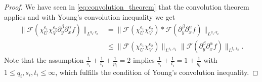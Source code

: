 \documentclass[a4paper]{article}
\newcommand{\conv}[0]{*}
\newcommand{\norm}[2]{\|#1\|_{#2}}
\newcommand{\chF}[1]{\chi_{#1}}
\newcommand{\chEF}[2]{\chF{#1}^{#2}}
\numberwithin{equation}{section}
\theoremstyle{remark}
\begin{document}
\begin{proof}
    We have seen in \cref{eq:convolution_theorem} that the convolution theorem applies and with Young's convolution inequality we get
    \begin{align*}
        \norm{\mathscr{F}\left(\chEF{U}{\epsilon_1}\chEF{V}{\epsilon_2}
        {\partial_y^\beta\partial_x^\alpha f}\right)}{L^{q_1,q_2}}
        &=\norm{\mathscr{F}\left(\chEF{U}{\epsilon_1}\chEF{V}{\epsilon_2}\right)
        \conv
        \mathscr{F}\left({\partial_y^\beta\partial_x^\alpha f}\right)}{L^{q_1,q_2}}\\
        &\leq
        \norm{\mathscr{F}\left({\chEF{U}{\epsilon_1}\chEF{V}{\epsilon_2}}\right)}{L^{s_1,s_2}}
        \norm{\mathscr{F}{\left(\partial_y^\beta\partial_x^\alpha f\right)}}{L^{t_1,t_2}}.
    \end{align*}
    Note that the assumption \(\frac{1}{s_i}+\frac{1}{t_i}+\frac{1}{p_i}=2\) implies \(\frac{1}{s_i}+\frac{1}{t_i}=1+\frac{1}{q_i}\) with \(1\leq q_i,s_i,t_i\leq\infty\), which fulfills the condition of Young's convolution inequality.
    

\end{proof}
\end{document}
